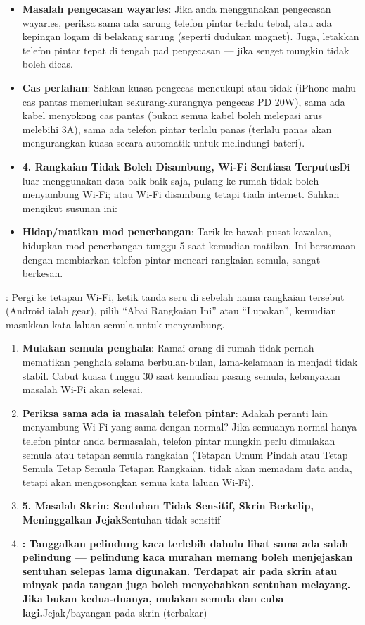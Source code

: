 \begin{itemize}
  \item \textbf{Masalah pengecasan wayarles}: Jika anda menggunakan pengecasan wayarles, periksa sama ada sarung telefon pintar terlalu tebal, atau ada kepingan logam di belakang sarung (seperti dudukan magnet). Juga, letakkan telefon pintar tepat di tengah pad pengecasan — jika senget mungkin tidak boleh dicas.
  \item \textbf{Cas perlahan}: Sahkan kuasa pengecas mencukupi atau tidak (iPhone mahu cas pantas memerlukan sekurang-kurangnya pengecas PD 20W), sama ada kabel menyokong cas pantas (bukan semua kabel boleh melepasi arus melebihi 3A), sama ada telefon pintar terlalu panas (terlalu panas akan mengurangkan kuasa secara automatik untuk melindungi bateri).
  \item \textbf{4. Rangkaian Tidak Boleh Disambung, Wi-Fi Sentiasa Terputus}Di luar menggunakan data baik-baik saja, pulang ke rumah tidak boleh menyambung Wi-Fi; atau Wi-Fi disambung tetapi tiada internet. Sahkan mengikut susunan ini:
  \item \textbf{Hidap/matikan mod penerbangan}: Tarik ke bawah pusat kawalan, hidupkan mod penerbangan tunggu 5 saat kemudian matikan. Ini bersamaan dengan membiarkan telefon pintar mencari rangkaian semula, sangat berkesan.
\end{itemize}


: Pergi ke tetapan Wi-Fi, ketik tanda seru di sebelah nama rangkaian tersebut (Android ialah gear), pilih “Abai Rangkaian Ini” atau “Lupakan”, kemudian masukkan kata laluan semula untuk menyambung.

\begin{enumerate}
  \item \textbf{Mulakan semula penghala}: Ramai orang di rumah tidak pernah mematikan penghala selama berbulan-bulan, lama-kelamaan ia menjadi tidak stabil. Cabut kuasa tunggu 30 saat kemudian pasang semula, kebanyakan masalah Wi-Fi akan selesai.
  \item \textbf{Periksa sama ada ia masalah telefon pintar}: Adakah peranti lain menyambung Wi-Fi yang sama dengan normal? Jika semuanya normal hanya telefon pintar anda bermasalah, telefon pintar mungkin perlu dimulakan semula atau tetapan semula rangkaian (Tetapan Umum Pindah atau Tetap Semula Tetap Semula Tetapan Rangkaian, tidak akan memadam data anda, tetapi akan mengosongkan semua kata laluan Wi-Fi).
  \item \textbf{5. Masalah Skrin: Sentuhan Tidak Sensitif, Skrin Berkelip, Meninggalkan Jejak}Sentuhan tidak sensitif
  \item \textbf{: Tanggalkan pelindung kaca terlebih dahulu lihat sama ada salah pelindung — pelindung kaca murahan memang boleh menjejaskan sentuhan selepas lama digunakan. Terdapat air pada skrin atau minyak pada tangan juga boleh menyebabkan sentuhan melayang. Jika bukan kedua-duanya, mulakan semula dan cuba lagi.}Jejak/bayangan pada skrin (terbakar)
\end{enumerate}


